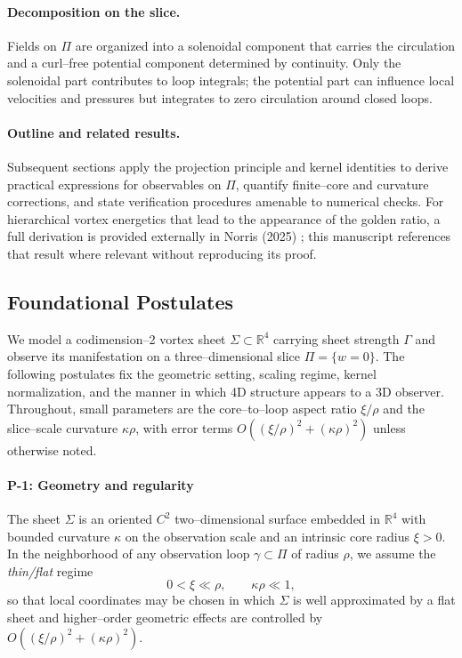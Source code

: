 \paragraph{Decomposition on the slice.}
Fields on $\Pi$ are organized into a solenoidal component that carries the circulation and a curl–free potential component determined by continuity. Only the solenoidal part contributes to loop integrals; the potential part can influence local velocities and pressures but integrates to zero circulation around closed loops.

\paragraph{Outline and related results.}
Subsequent sections apply the projection principle and kernel identities to derive practical expressions for observables on $\Pi$, quantify finite–core and curvature corrections, and state verification procedures amenable to numerical checks. For hierarchical vortex energetics that lead to the appearance of the golden ratio, a full derivation is provided externally in Norris (2025) \cite{Norris2025GoldenRatio}; this manuscript references that result where relevant without reproducing its proof.

\subsection{Foundational Postulates}
\label{sec:foundational-postulates}

We model a codimension–2 vortex sheet $\Sigma\subset\mathbb{R}^4$ carrying sheet strength $\Gamma$ and observe its manifestation on a three–dimensional slice $\Pi=\{w=0\}$. The following postulates fix the geometric setting, scaling regime, kernel normalization, and the manner in which 4D structure appears to a 3D observer. Throughout, small parameters are the core–to–loop aspect ratio $\xi/\rho$ and the slice–scale curvature $\kappa\rho$, with error terms $O((\xi/\rho)^2+(\kappa\rho)^2)$ unless otherwise noted.

\paragraph{P-1: Geometry and regularity}
\label{post:P1}
The sheet $\Sigma$ is an oriented $C^2$ two–dimensional surface embedded in $\mathbb{R}^4$ with bounded curvature $\kappa$ on the observation scale and an intrinsic core radius $\xi>0$. In the neighborhood of any observation loop $\gamma\subset\Pi$ of radius $\rho$, we assume the \emph{thin/flat} regime
\[
0<\xi \ll \rho, \qquad \kappa\rho \ll 1,
\]
so that local coordinates may be chosen in which $\Sigma$ is well approximated by a flat sheet and higher–order geometric effects are controlled by $O((\xi/\rho)^2+(\kappa\rho)^2)$.

